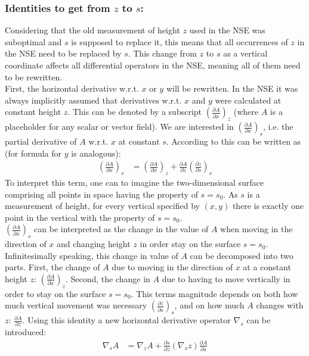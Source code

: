 \subsubsection{Identities to get from $z$ to $s$:}
Considering that the old measurement of height $z$ used in the NSE was suboptimal and $s$ is supposed to replace it, this means that all occurrences of $z$ in the NSE need to be replaced by $s$.
This change from $z$ to $s$ as a vertical coordinate affects all differential operators in the NSE, meaning all of them need to be rewritten.
\\
First, the horizontal derivative w.r.t. $x$ or $y$ will be rewritten.
In the NSE it was always implicitly assumed that derivatives w.r.t. $x$ and $y$ were calculated at constant height $z$.
This can be denoted by a subscript $\left(\frac{\partial A}{\partial x}\right)_z$ (where $A$ is a placeholder for any scalar or vector field).
We are interested in $\left(\frac{\partial A}{\partial x}\right)_s$, i.e. the partial derivative of $A$ w.r.t. $x$ at constant $s$.
According to \cite{kasahara1974various} this can be written as (for formula for $y$ is analogous):
\begin{align*}
\left(\frac{\partial A}{\partial x}\right)_s &= \left( \frac{\partial A}{\partial x}\right)_z + \frac{\partial A}{\partial z}\left(\frac{\partial z}{\partial s}\right)_s
\end{align*}
To interpret this term, one can to imagine the two-dimensional surface comprising all points in space having the property of $s=s_0$.
As $s$ is a measurement of height, for every vertical specified by $(x,y)$ there is exactly one point in the vertical with the property of $s=s_0$.
\\
$\left(\frac{\partial A}{\partial x}\right)_s$ can be interpreted as the change in the value of $A$ when moving in the direction of $x$ and changing height $z$ in order stay on the surface $s=s_0$.
Infinitesimally speaking, this change in value of $A$ can be decomposed into two parts.
First, the change of $A$ due to moving in the direction of $x$ at a constant height $z$: $\left( \frac{\partial A}{\partial x}\right)_z$.
Second, the change in $A$ due to having to move vertically in order to stay on the surface $s=s_0$.
This terms magnitude depends on both how much vertical movement was necessary $\left(\frac{\partial z}{\partial s}\right)_s$, and on how much $A$ changes with $z$: $\frac{\partial A}{\partial z}$. 
Using this identity a new horizontal derivative operator $\nabla_s$ can be introduced:
\begin{align}
\nabla _s A &= \nabla _z A+\frac{\partial s}{\partial z}(\nabla _sz)\frac{\partial A}{\partial s}\label{id_h_diff}
\end{align}

